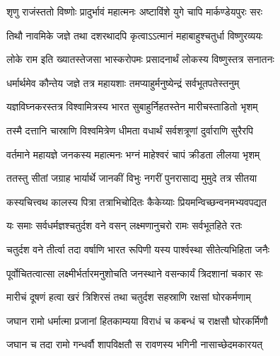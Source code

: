 
\translink{}

\storymeta



\twolineshloka
{शृणु राजंस्ततो विष्णोः प्रादुर्भावं महात्मनः}
{अष्टाविंशे युगे चापि मार्कण्डेयपुरः सरः}


\twolineshloka
{तिथौ नावमिके जज्ञे तथा दशरथादपि}
{कृत्वाऽऽत्मानं महाबाहुश्चतुर्धा विष्णुरव्ययः}


\twolineshloka
{लोके राम इति ख्यातस्तेजसा भास्करोपमः}
{प्रसादनार्थं लोकस्य विष्णुस्तत्र सनातनः}


\twolineshloka
{धर्मार्थमेव कौन्तेय जज्ञे तत्र महायशाः}
{तमप्याहुर्मनुष्येन्द्रं सर्वभूतपतेस्तनुम्}


\twolineshloka
{यज्ञविघ्नकरस्तत्र विश्वामित्रस्य भारत}
{सुबाहुर्निहतस्तेन मारीचस्ताडितो भृशम्}


\twolineshloka
{तस्मै दत्तानि चास्राणि विश्वमित्रेण धीमता}
{वधार्थं सर्वशत्रूणां दुर्वाराणि सुरैरपि}


\twolineshloka
{वर्तमाने महायज्ञे जनकस्य महात्मनः}
{भग्नं माहेश्वरं चापं क्रीडता लीलया भृशम्}


\twolineshloka
{ततस्तु सीतां जग्राह भार्यार्थे जानकीं विभुः}
{नगरीं पुनरासाद्य मुमुदे तत्र सीतया}


\twolineshloka
{कस्यचित्त्वथ कालस्य पित्रा तत्राभिचोदितः}
{कैकेय्याः प्रियमन्विच्छन्वनमभ्यवपद्यत}


\twolineshloka
{यः समाः सर्वधर्मज्ञश्चतुर्दश वने वसन्}
{लक्ष्मणानुचरो रामः सर्वभूतहिते रतः}


\twolineshloka
{चतुर्दश वने तीर्त्वा तदा वर्षाणि भारत}
{रूपिणी यस्य पार्श्वस्था सीतेत्यभिहिता जनैः}


\twolineshloka
{पूर्वोचितत्वात्सा लक्ष्मीर्भर्तारमनुशोचति}
{जनस्थाने वसन्कार्यं त्रिदशानां चकार सः}


\twolineshloka
{मारीचं दूषणं हत्वा खरं त्रिशिरसं तथा}
{चतुर्दश सहस्राणि रक्षसां घोरकर्मणाम्}


\twolineshloka
{जघान रामो धर्मात्मा प्रजानां हितकाम्यया}
{विराधं च कबन्धं च राक्षसौ घोरकर्मिणौ}


\twolineshloka
{जघान च तदा रामो गन्धर्वौ शापविक्षतौ}
{स रावणस्य भगिनी नासाच्छेदमकारयत्}


